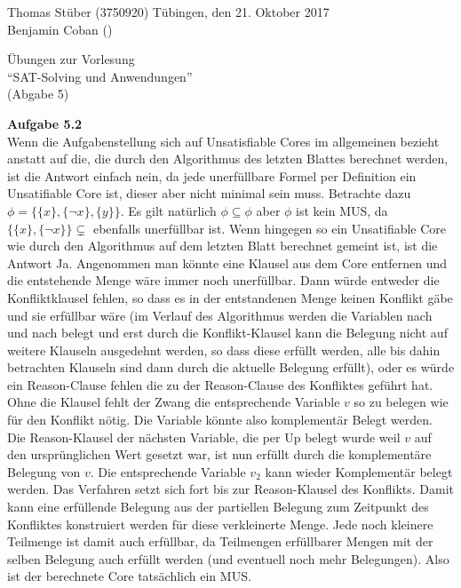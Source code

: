 \documentclass[a4paper,10pt]{article}
\title{}
\author{}
\begin{document}
\noindent Thomas Stüber (3750920) \hfill Tübingen, den  21. Oktober 2017\\
\noindent Benjamin Coban () \\
\begin{center}
\Large Übungen zur Vorlesung  \\ ``SAT-Solving und Anwendungen'' \\
\vspace*{2mm}
\large (Abgabe 5) \\
\vspace*{2mm}
\end{center}

\noindent\textbf{Aufgabe 5.2}\\\smallskip
Wenn die Aufgabenstellung sich auf Unsatisfiable Cores im allgemeinen bezieht anstatt auf die, die durch den Algorithmus des letzten Blattes berechnet werden, ist die Antwort einfach nein, da jede unerfüllbare Formel per Definition ein Unsatifiable Core ist, dieser aber nicht minimal sein muss. Betrachte dazu $\phi = \{\{x\}, \{\neg x\}, \{y\}\}$. Es gilt natürlich $\phi \subseteq \phi$ aber $\phi$ ist kein MUS, da $\{\{x\}, \{\neg x\}\} \subsetneq$ ebenfalls unerfüllbar ist. Wenn hingegen so ein Unsatifiable Core wie durch den Algorithmus auf dem letzten Blatt berechnet gemeint ist, ist die Antwort Ja. Angenommen man könnte eine Klausel aus dem Core entfernen und die entstehende Menge wäre immer noch unerfüllbar. Dann würde entweder die Konfliktklausel fehlen, so dass es in der entstandenen Menge keinen Konflikt gäbe und sie erfüllbar wäre (im Verlauf des Algorithmus werden die Variablen nach und nach belegt und erst durch die Konflikt-Klausel kann die Belegung nicht auf weitere Klauseln ausgedehnt werden, so dass diese erfüllt werden, alle bis dahin betrachten Klauseln sind dann durch die aktuelle Belegung erfüllt), oder es würde ein Reason-Clause fehlen die zu der Reason-Clause des Konfliktes geführt hat. Ohne die Klausel fehlt der Zwang die entsprechende Variable $v$ so zu belegen wie für den Konflikt nötig. Die Variable könnte also komplementär Belegt werden. Die Reason-Klausel der nächsten Variable, die per Up belegt wurde weil $v$ auf den ursprünglichen Wert gesetzt war, ist nun erfüllt durch die komplementäre Belegung von $v$. Die entsprechende Variable $v_2$ kann wieder Komplementär belegt werden. Das Verfahren setzt sich fort bis zur Reason-Klausel des Konflikts. Damit kann eine erfüllende Belegung aus der partiellen Belegung zum Zeitpunkt des Konfliktes konstruiert werden für diese verkleinerte Menge. Jede noch kleinere Teilmenge ist damit auch erfüllbar, da Teilmengen erfüllbarer Mengen mit der selben Belegung auch erfüllt werden (und eventuell noch mehr Belegungen). Also ist der berechnete Core tatsächlich ein MUS.
\end{document}
